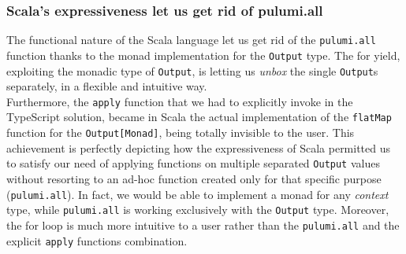 \subsubsection{Scala's expressiveness let us get rid of pulumi.all}
The functional nature of the Scala language let us get rid of the \texttt{pulumi.all} function thanks to the monad implementation for the \texttt{Output} type.
The for yield, exploiting the monadic type of \texttt{Output}, is letting us \textit{unbox} the single \texttt{Output}s separately, in a flexible and intuitive way.\\
Furthermore, the \texttt{apply} function that we had to explicitly invoke in the TypeScript solution, became in Scala the actual implementation of the \texttt{flatMap} function for the \texttt{Output[Monad]}, being totally invisible to the user.
This achievement is perfectly depicting how the expressiveness of Scala permitted us to satisfy our need of applying functions on multiple separated \texttt{Output} values without resorting to an ad-hoc function created only for that specific purpose (\texttt{pulumi.all}).
In fact, we would be able to implement a monad for any \textit{context} type, while \texttt{pulumi.all} is working exclusively with the \texttt{Output} type.
Moreover, the for loop is much more intuitive to a user rather than the \texttt{pulumi.all} and the explicit \texttt{apply} functions combination.






